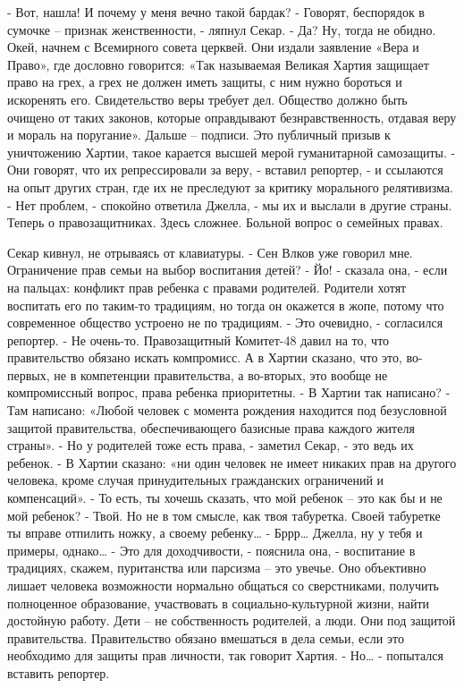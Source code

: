 \documentclass[10pt,final]{book}
\begin{document}
- Вот, нашла! И почему у меня вечно такой бардак?
- Говорят, беспорядок в сумочке -- признак женственности, - ляпнул Секар.
- Да? Ну, тогда не обидно. Окей, начнем с Всемирного совета церквей. Они издали заявление «Вера и Право», где дословно говорится: «Так называемая Великая Хартия защищает право на грех, а грех не должен иметь защиты, с ним нужно бороться и искоренять его. Свидетельство веры требует дел. Общество должно быть очищено от таких законов, которые оправдывают безнравственность, отдавая веру и мораль на поругание». Дальше -- подписи. Это публичный призыв к уничтожению Хартии, такое карается высшей мерой гуманитарной самозащиты.
- Они говорят, что их репрессировали за веру, - вставил репортер, - и ссылаются на опыт других стран, где их не преследуют за критику морального релятивизма.
- Нет проблем, - спокойно ответила Джелла, - мы их и выслали в другие страны. Теперь о правозащитниках. Здесь сложнее. Больной вопрос о семейных правах.

Секар кивнул, не отрываясь от клавиатуры.
- Сен Влков уже говорил мне. Ограничение прав семьи на выбор воспитания детей?
- Йо! - сказала она, - если на пальцах: конфликт прав ребенка с правами родителей. Родители хотят воспитать его по таким-то традициям, но тогда он окажется в жопе, потому что современное общество устроено не по традициям.
- Это очевидно, - согласился репортер.
- Не очень-то. Правозащитный Комитет-48 давил на то, что правительство обязано искать компромисс. А в Хартии сказано, что это, во-первых, не в компетенции правительства, а во-вторых, это вообще не компромиссный вопрос, права ребенка приоритетны.
- В Хартии так написано?
- Там написано: «Любой человек с момента рождения находится под безусловной защитой правительства, обеспечивающего базисные права каждого жителя страны».
- Но у родителей тоже есть права, - заметил Секар, - это ведь их ребенок.
- В Хартии сказано: «ни один человек не имеет никаких прав на другого человека, кроме случая принудительных гражданских ограничений и компенсаций».
- То есть, ты хочешь сказать, что мой ребенок -- это как бы и не мой ребенок?
- Твой. Но не в том смысле, как твоя табуретка. Своей табуретке ты вправе отпилить ножку, а своему ребенку\ldots{}
- Бррр\ldots{} Джелла, ну у тебя и примеры, однако\ldots{}
- Это для доходчивости, - пояснила она, - воспитание в традициях, скажем, пуританства или парсизма -- это увечье. Оно объективно лишает человека возможности нормально общаться со сверстниками, получить полноценное образование, участвовать в социально-культурной жизни, найти достойную работу. Дети -- не собственность родителей, а люди. Они под защитой правительства. Правительство обязано вмешаться в дела семьи, если это необходимо для защиты прав личности, так говорит Хартия.
- Но\ldots{} - попытался вставить репортер.
\end{document}
